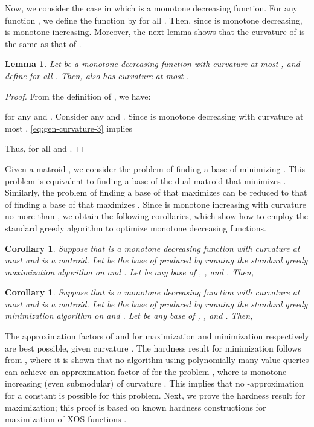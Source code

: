 \documentclass{article}
\newtheorem{lemma}[theorem]{Lemma}
\newtheorem{corollary}[theorem]{Corollary}
\theoremstyle{definition}
\begin{document}
Now, we consider the case in which  is a monotone decreasing function.  For any function , we define the function  by  for all .  Then, since  is monotone decreasing,  is monotone increasing.  Moreover, the next lemma shows that the curvature of  is the same as that of .

\begin{lemma}
\label{lem:increasing-decreasing-curvature}
Let  be a monotone decreasing function with curvature at most , and define  for all .  Then,  also has curvature at most .
\end{lemma}
\begin{proof}
From the definition of , we have:

for any  and .  Consider any  and .   Since  is monotone decreasing with curvature at most , \eqref{eq:gen-curvature-3} implies

Thus,  for all  and .
\end{proof}

Given a matroid , we consider the problem of finding a base of  minimizing .  This problem is equivalent to finding a base of the dual matroid  that minimizes .  Similarly, the problem of finding a base of  that maximizes  can be reduced to that of finding a base of  that maximizes .  Since  is monotone increasing with curvature no more than , we obtain the following corollaries, which show how to employ the standard greedy algorithm to optimize monotone decreasing functions.
\begin{corollary}
\label{thm:arbitrary-max-decreasing}
Suppose that  is a monotone decreasing function with curvature at most  and  is a matroid.  Let  be the base of  produced by running the standard greedy maximization algorithm on  and .  Let  be any base of , , and .  Then,

\end{corollary}
\begin{corollary}
\label{thm:arbitrary-min-decreasing}
Suppose that  is a monotone decreasing function with curvature at most  and  is a matroid.  Let  be the base of  produced by running the standard greedy minimization algorithm on  and .  Let  be any base of , , and .  Then,

\end{corollary}

The approximation factors of  and  for maximization and minimization respectively are best possible, given curvature .
The hardness result for minimization follows from \cite{IJB}, where it is shown that no algorithm using polynomially many value queries can achieve an approximation factor of  for the problem , where  is monotone increasing (even submodular) of curvature . This implies that no -approximation for a constant  is possible for this problem. Next, we prove the hardness result for maximization; this proof is based on known hardness constructions for maximization of XOS functions \cite{DobzinskiS06,MirrokniSV08}.
\end{document}
